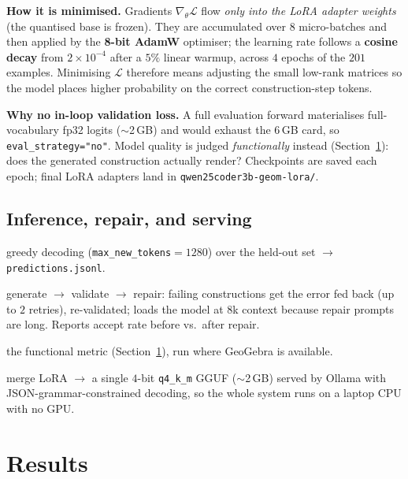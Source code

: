 \documentclass[11pt]{article}
\newcommand{\code}[1]{\texttt{\small #1}}
\begin{document}
\medskip\noindent\textbf{How it is minimised.} Gradients
$\nabla_\theta \mathcal{L}$ flow \emph{only into the LoRA adapter weights}
(the quantised base is frozen). They are accumulated over $8$ micro-batches and
then applied by the \textbf{8-bit AdamW} optimiser; the learning rate follows a
\textbf{cosine decay} from $2\times10^{-4}$ after a $5\%$ linear warmup, across
$4$ epochs of the $201$ examples. Minimising $\mathcal{L}$ therefore means
adjusting the small low-rank matrices so the model places higher probability on
the correct construction-step tokens.

\medskip\noindent\textbf{Why no in-loop validation loss.} A full evaluation
forward materialises full-vocabulary fp32 logits ($\sim$2\,GB) and would
exhaust the $6$\,GB card, so \code{eval\_strategy="no"}. Model quality is judged
\emph{functionally} instead (Section~\ref{sec:results}): does the generated
construction actually render? Checkpoints are saved each epoch; final LoRA
adapters land in \code{qwen25coder3b-geom-lora/}.

\subsection{Inference, repair, and serving}
\begin{description}[style=nextline,leftmargin=1.2em,nosep]
  \item[\texttt{infer.py}] greedy decoding (\code{max\_new\_tokens}$=1280$) over
    the held-out set $\to$ \code{predictions.jsonl}.
  \item[\texttt{repair\_loop.py}] generate $\to$ validate $\to$ repair: failing
    constructions get the error fed back (up to $2$ retries), re-validated; loads
    the model at $8$k context because repair prompts are long. Reports accept
    rate before vs.\ after repair.
  \item[\texttt{eval\_predictions.py}] the functional metric
    (Section~\ref{sec:results}), run where GeoGebra is available.
  \item[\texttt{export\_gguf.py} / \texttt{geom.Modelfile} /
    \texttt{predict\_local.py}] merge LoRA $\to$ a single $4$-bit \code{q4\_k\_m}
    GGUF ($\sim$2\,GB) served by Ollama with JSON-grammar-constrained decoding,
    so the whole system runs on a laptop CPU with no GPU.
\end{description}

\section{Results}
\label{sec:results}
\end{document}

